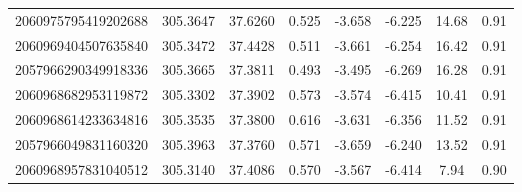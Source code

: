 \begin{longtable}{lccccccc}
2060975795419202688 & 305.3647 & 37.6260 & 0.525 & -3.658 & -6.225 & 14.68 & 0.91 \\
2060969404507635840 & 305.3472 & 37.4428 & 0.511 & -3.661 & -6.254 & 16.42 & 0.91 \\
2057966290349918336 & 305.3665 & 37.3811 & 0.493 & -3.495 & -6.269 & 16.28 & 0.91 \\
2060968682953119872 & 305.3302 & 37.3902 & 0.573 & -3.574 & -6.415 & 10.41 & 0.91 \\
2060968614233634816 & 305.3535 & 37.3800 & 0.616 & -3.631 & -6.356 & 11.52 & 0.91 \\
2057966049831160320 & 305.3963 & 37.3760 & 0.571 & -3.659 & -6.240 & 13.52 & 0.91 \\
2060968957831040512 & 305.3140 & 37.4086 & 0.570 & -3.567 & -6.414 & 7.94 & 0.90 \\


\end{longtable}

